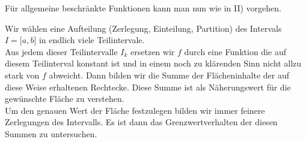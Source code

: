 \begin{enumerate}[\indent I)]
\begin{center}
\begin{tikzpicture}
\end{tikzpicture}
\end{center}

Für allgemeine beschränkte Funktionen kann man nun wie in II) vorgehen.

\begin{center}
\end{center}

Wir wählen eine Aufteilung (Zerlegung, Einteilung, Partition) des Intervals $I=\lbrack a,b\rbrack$ in endlich viele Teilintervale. \\

Aus jedem dieser Teilintervalle $I_k$ ersetzen wir $f$ durch eine Funktion die auf diesem Teilinterval konstant ist und in einem noch zu klärenden Sinn nicht allzu stark von $f$ abweicht. Dann bilden wir die Summe der Flächeninhalte der auf diese Weise erhaltenen Rechtecke. Diese Summe ist als Näherungswert für die gewünschte Fläche zu verstehen. \\

Um den genauen Wert der Fläche festzulegen bilden wir immer feinere Zerlegungen des Intervalls. Es ist dann das Grenzwertverhalten der diesen Summen zu untersuchen. 
\end{enumerate}
